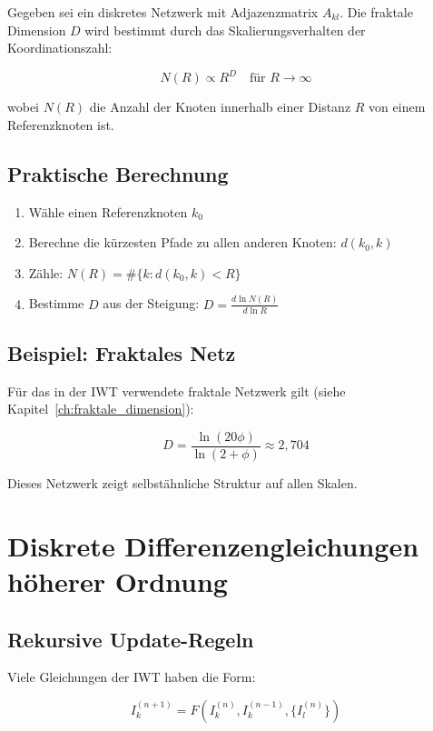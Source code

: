 Gegeben sei ein diskretes Netzwerk mit Adjazenzmatrix \( A_{kl} \). Die fraktale Dimension \( D \) wird bestimmt durch das Skalierungsverhalten der Koordinationszahl:

\[
N(R) \propto R^D \quad \text{für } R \to \infty
\]

wobei \( N(R) \) die Anzahl der Knoten innerhalb einer Distanz \( R \) von einem Referenzknoten ist.

\subsection{Praktische Berechnung}
\label{sub:mathematik_fraktale_berechnung}

\begin{enumerate}
    \item Wähle einen Referenzknoten \( k_0 \)
    \item Berechne die kürzesten Pfade zu allen anderen Knoten: \( d(k_0, k) \)
    \item Zähle: \( N(R) = \#\{k : d(k_0, k) < R\} \)
    \item Bestimme \( D \) aus der Steigung: \( D = \frac{d \ln N(R)}{d \ln R} \)
\end{enumerate}

\subsection{Beispiel: Fraktales Netz}
\label{sub:mathematik_fraktales_netz}

Für das in der IWT verwendete fraktale Netzwerk gilt (siehe Kapitel~\ref{ch:fraktale_dimension}):

\[
D = \frac{\ln(20\phi)}{\ln(2 + \phi)} \approx 2,704
\]

Dieses Netzwerk zeigt selbstähnliche Struktur auf allen Skalen.

\section{Diskrete Differenzengleichungen höherer Ordnung}
\label{app:mathematik_differenzengleichungen}

\subsection{Rekursive Update-Regeln}
\label{sub:mathematik_update}

Viele Gleichungen der IWT haben die Form:

\[
I_k^{(n+1)} = F\left( I_k^{(n)}, I_k^{(n-1)}, \{I_l^{(n)}\} \right)
\]

